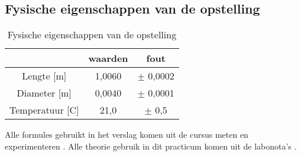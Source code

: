 \subsection{Fysische eigenschappen van de opstelling}


\begin{table}[h]
    \centering
    \caption{Fysische eigenschappen van de opstelling}
    \begin{tabular}{| c | c | c |}
        \hline
                        & waarden   & fout       \\ \hline
        Lengte [m]      & 1,0060    & $\pm$ 0,0002 \\ \hline
        Diameter [m]    & 0,0040    & $\pm$ 0,0001 \\ \hline
        Temperatuur [C] & 21,0      & $\pm$ 0,5    \\ \hline
        
    \end{tabular}
\end{table}

Alle formules gebruikt in het verslag komen uit de cursus meten en experimenteren \cite{cursusMnE}.
Alle theorie gebruik in dit practicum komen uit de labonota's \cite{LaboNotasMnE}.